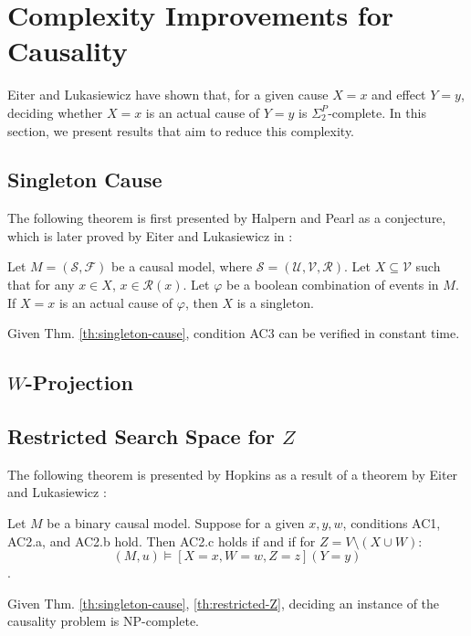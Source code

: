 \section{Complexity Improvements for Causality}

Eiter and Lukasiewicz \cite{eiter2001complexity} have shown that, for
a given cause $X=x$ and effect $Y=y$, deciding whether $X=x$ is an
actual cause of $Y=y$ is $\Sigma_2^P$-complete. In this section, we 
present results that aim to reduce this complexity.

\subsection{Singleton Cause}

The following theorem is first presented by Halpern and Pearl as a 
conjecture, which is later proved by Eiter and Lukasiewicz in 
\cite{eiter2001complexity}:

\begin{theorem}\label{th:singleton-cause}
    Let $M=(\mathcal{S}, \mathcal{F})$ be a causal model, where 
    $\mathcal{S}=(\mathcal{U}, \mathcal{V}, \mathcal{R})$. 
    Let $X \subseteq \mathcal{V}$ such that for any $x \in X$, 
    $x \in \mathcal{R}(x)$. Let $\varphi$ be a boolean combination of
    events in $M$. If $X=x$ is an actual cause of $\varphi$, then $X$
    is a singleton.
\end{theorem}

Given Thm. \ref{th:singleton-cause}, condition AC3 can be verified
in constant time.

\subsection{\texorpdfstring
    {$W$-Projection}
    {\textit{W}-Projection}
}


\subsection{\texorpdfstring
    {Restricted Search Space for $Z$}
    {Restricte Search Space for \textit{Z}}
}

The following theorem is presented by Hopkins
\cite{hopkins2002strategies} as a result of a theorem by Eiter and 
Lukasiewicz \cite{eiter2001complexity}:

\begin{theorem}\label{th:restricted-Z}
    Let $M$ be a binary causal model. Suppose for a given $x,y,w$, 
    conditions AC1, AC2.a, and AC2.b hold. Then AC2.c holds if and 
    if for $Z=V \setminus (X \cup W)$:
    $$ (M, u) \models [X=x, W=w, Z=z] (Y=y) $$. 
\end{theorem}

Given Thm. \ref{th:singleton-cause}, \ref{th:restricted-Z}, deciding 
an instance of the causality problem is NP-complete.